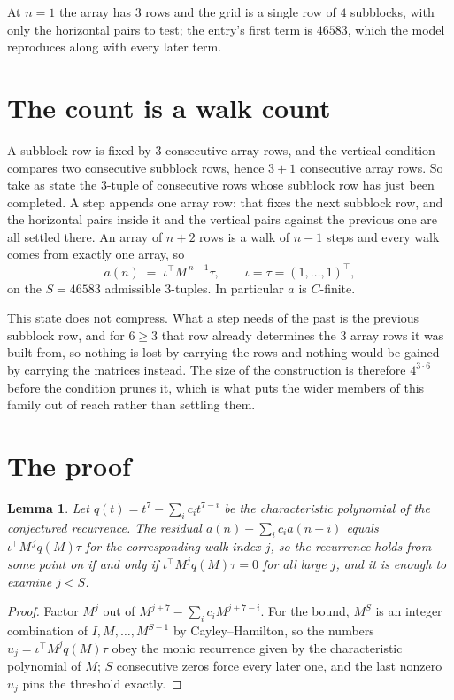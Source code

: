 \documentclass[11pt,a4paper]{article}
\theoremstyle{plain}
\newtheorem{lemma}[theorem]{Lemma}
\theoremstyle{definition}
\begin{document}
At $n=1$ the array has $3$ rows and the grid is a single row of $4$
subblocks, with only the horizontal pairs to test; the entry's first term is
$46583$, which the model reproduces along with every later term.

\section{The count is a walk count}

A subblock row is fixed by $3$ consecutive array rows, and the vertical condition compares
two consecutive subblock rows, hence $3+1$ consecutive array rows. So take as state the
$3$-tuple of consecutive rows whose subblock row has just been completed. A step appends one
array row: that fixes the next subblock row, and the horizontal pairs inside it and the
vertical pairs against the previous one are all settled there. An array of $n+2$ rows is
a walk of $n-1$ steps and every walk comes from exactly one array, so
\[
a(n)\;=\;\iota^{\!\top}M^{\,n-1}\tau,\qquad\iota=\tau=(1,\dots,1)^{\!\top},
\]
on the $S=46583$ admissible $3$-tuples. In particular $a$ is $C$-finite.

This state does not compress. What a step needs of the past is the previous subblock row, and
for $6\ge3$ that row already determines the $3$ array rows it was built from, so nothing
is lost by carrying the rows and nothing would be gained by carrying the matrices instead. The
size of the construction is therefore $4^{3\cdot6}$ before the condition prunes
it, which is what puts the wider members of this family out of reach rather than settling them.

\section{The proof}

\begin{lemma}\label{lem:crit}
Let $q(t)=t^{7}-\sum_i c_it^{7-i}$ be the characteristic polynomial of the
conjectured recurrence. The residual $a(n)-\sum_ic_ia(n-i)$ equals
$\iota^{\!\top}M^{\,j}q(M)\tau$ for the corresponding walk index $j$, so the recurrence
holds from some point on if and only if $\iota^{\!\top}M^{j}q(M)\tau=0$ for all large $j$,
and it is enough to examine $j<S$.
\end{lemma}

\begin{proof}
Factor $M^{j}$ out of $M^{j+7}-\sum_ic_iM^{j+7-i}$. For the bound, $M^{S}$
is an integer combination of $I,M,\dots,M^{S-1}$ by Cayley--Hamilton, so the numbers
$u_j=\iota^{\!\top}M^{j}q(M)\tau$ obey the monic recurrence given by the characteristic
polynomial of $M$; $S$ consecutive zeros force every later one, and the last nonzero $u_j$
pins the threshold exactly.
\end{proof}
\end{document}
